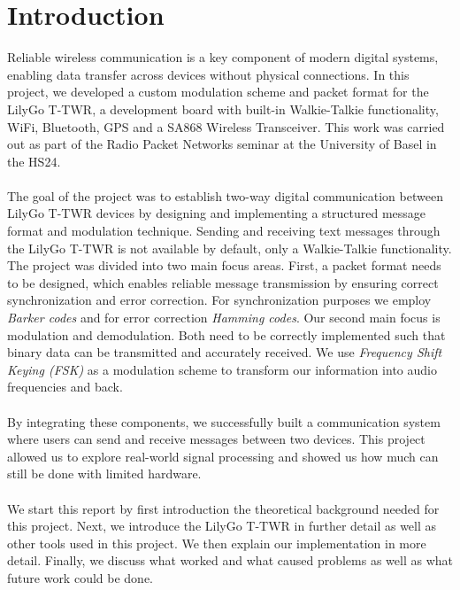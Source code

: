 \chapter{Introduction}
Reliable wireless communication is a key component of modern digital systems, enabling data transfer across devices without physical connections. In this project, we developed a custom modulation scheme and packet format for the LilyGo T-TWR, a development board with built-in Walkie-Talkie functionality, WiFi, Bluetooth, GPS and a SA868 Wireless Transceiver. This work was carried out as part of the Radio Packet Networks seminar at the University of Basel in the HS24.
\\\\
The goal of the project was to establish two-way digital communication between LilyGo T-TWR devices by designing and implementing a structured message format and modulation technique. Sending and receiving text messages through the LilyGo T-TWR is not available by default, only a Walkie-Talkie functionality. The project was divided into two main focus areas. First, a packet format needs to be designed, which enables reliable message transmission by ensuring correct synchronization and error correction. For synchronization purposes we employ \textit{Barker codes} and for error correction \textit{Hamming codes}. Our second main focus is modulation and demodulation. Both need to be correctly implemented such that binary data can be transmitted and accurately received. We use \textit{Frequency Shift Keying (FSK)} as a modulation scheme to transform our information into audio frequencies and back. %
\\ \\
By integrating these components, we successfully built a communication system where users can send and receive messages between two devices. This project allowed us to explore real-world signal processing and showed us how much can still be done with limited hardware.
\\ \\
We start this report by first introduction the theoretical background needed for this project. Next, we introduce the LilyGo T-TWR in further detail as well as other tools used in this project. We then explain our implementation in more detail. Finally, we discuss what worked and what caused problems as well as what future work could be done.